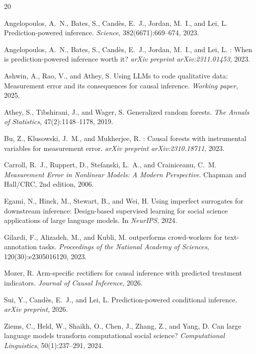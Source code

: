 \documentclass[11pt,a4paper]{article}
\begin{document}
\begin{thebibliography}{20}

Angelopoulos, A.~N., Bates, S., Cand\`{e}s, E.~J., Jordan, M.~I., and Lei, L.
\newblock Prediction-powered inference.
\newblock \emph{Science}, 382(6671):669--674, 2023.

Angelopoulos, A.~N., Bates, S., Cand\`{e}s, E.~J., Jordan, M.~I., and Lei, L.
: When is prediction-powered inference worth it?
\newblock \emph{arXiv preprint arXiv:2311.01453}, 2023.

Ashwin, A., Rao, V., and Athey, S.
\newblock Using {LLM}s to code qualitative data: Measurement error and its consequences for causal inference.
\newblock \emph{Working paper}, 2025.

Athey, S., Tibshirani, J., and Wager, S.
\newblock Generalized random forests.
\newblock \emph{The Annals of Statistics}, 47(2):1148--1178, 2019.

Bu, Z., Klusowski, J.~M., and Mukherjee, R.
: Causal forests with instrumental variables for measurement error.
\newblock \emph{arXiv preprint arXiv:2310.18711}, 2023.

Carroll, R.~J., Ruppert, D., Stefanski, L.~A., and Crainiceanu, C.~M.
\newblock \emph{Measurement Error in Nonlinear Models: A Modern Perspective}.
\newblock Chapman and Hall/CRC, 2nd edition, 2006.

Egami, N., Hinck, M., Stewart, B., and Wei, H.
\newblock Using imperfect surrogates for downstream inference: Design-based supervised learning for social science applications of large language models.
\newblock In \emph{NeurIPS}, 2024.

Gilardi, F., Alizadeh, M., and Kubli, M.
 outperforms crowd-workers for text-annotation tasks.
\newblock \emph{Proceedings of the National Academy of Sciences}, 120(30):e2305016120, 2023.

Mozer, R.
\newblock Arm-specific rectifiers for causal inference with predicted treatment indicators.
\newblock \emph{Journal of Causal Inference}, 2026.

Sui, Y., Cand\`{e}s, E.~J., and Lei, L.
\newblock Prediction-powered conditional inference.
\newblock \emph{arXiv preprint}, 2026.

Ziems, C., Held, W., Shaikh, O., Chen, J., Zhang, Z., and Yang, D.
\newblock Can large language models transform computational social science?
\newblock \emph{Computational Linguistics}, 50(1):237--291, 2024.

\end{thebibliography}
\end{document}
